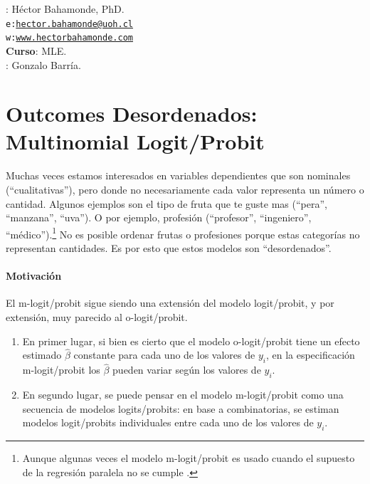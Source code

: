 \documentclass[onesided]{article}\usepackage[]{graphicx}\usepackage[]{color}
\begin{document}











\hspace{-5mm}{\bf Profesor}: H\'ector Bahamonde, PhD.\\
\texttt{e:}\href{mailto:hector.bahamonde@uoh.cl}{\texttt{hector.bahamonde@uoh.cl}}\\
\texttt{w:}\href{http://www.hectorbahamonde.com}{\texttt{www.hectorbahamonde.com}}\\
{\bf Curso}: MLE.\\
\hspace{-5mm}{\bf TA}: Gonzalo Barr\'ia.

\section{Outcomes Desordenados: Multinomial Logit/Probit}

Muchas veces estamos interesados en variables dependientes que son nominales (``cualitativas''), pero donde no necesariamente cada valor representa un n\'umero o cantidad. Algunos ejemplos son el tipo de fruta que te guste mas (``pera'', ``manzana'', ``uva''). O por ejemplo, profesi\'on (``profesor'', ``ingeniero'', ``m\'edico'').\footnote{Aunque algunas veces el modelo m-logit/probit es usado cuando el supuesto de la regresi\'on paralela no se cumple \parencite[148]{Long:1997wv}.} No es posible ordenar frutas o profesiones porque estas categor\'ias no representan cantidades. Es por esto que estos modelos son ``desordenados''.

\paragraph{Motivaci\'on} El m-logit/probit sigue siendo una extensi\'on del modelo logit/probit, y por extensi\'on, muy parecido al o-logit/probit. 

\begin{enumerate}
\item En primer lugar, si bien es cierto que el modelo o-logit/probit tiene un efecto estimado $\hat\beta$ constante para cada uno de los valores de $y_{i}$, en la especificaci\'on m-logit/probit los $\hat\beta$ pueden variar seg\'un los valores de $y_{i}$.
\item En segundo lugar, se puede pensar en el modelo m-logit/probit como una secuencia de modelos logits/probits: en base a combinatorias, se estiman modelos logit/probits individuales entre cada uno de los valores de $y_{i}$.
\end{enumerate}
\end{document}

